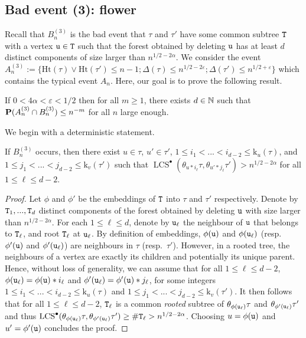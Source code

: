 \documentclass[11pt,reqno]{amsart}
\newcommand{\Ht}{\mathrm{Ht}}
\newcommand{\rk}{\mathrm{k}}
\newcommand{\LCS}{\operatorname{LCS}}
\begin{document}
\subsection{Bad event (3): flower}
Recall that $B_n^{(3)}$ is the bad event that $\tau$ and $\tau'$ have some common subtree $\mathtt{T}$ with a vertex $\mathtt{u} \in \mathtt{T}$ such that the forest obtained by deleting $\mathtt{u}$ has at least $d$ distinct components of size larger than $n^{1/2-2\alpha}$. We consider the event $A_n^{(3)}:=\{\Ht(\tau)\vee\Ht(\tau')\leq n-1 ; \Delta(\tau)\leq n^{1/2-2\varepsilon} ; \Delta(\tau')\leq n^{1/2+\varepsilon}\}$ which contains the typical event $A_n$. Here, our goal is to prove the following result. 

\begin{prop}
\label{prop:no_flowers}
    If $0 < 4\alpha < \varepsilon < 1/2$ then for all $m \geq 1$, there exists $d \in \mathbb{N}$ such that $\mathbf{P}(A_n^{(3)}\cap B_n^{(3)}) \leq n^{-m}$ for all $n$ large enough.
\end{prop}

We begin with a deterministic statement.

\begin{lem}
\label{deter-lemma:no_flowers}
If $B_n^{(3)}$ occurs, then there exist $u \in \tau$, $u' \in \tau'$, $1 \leq i_1 < ... < i_{d-2} \leq \rk_{u}(\tau)$, and $1 \leq j_1 < ... < j_{d-2} \leq \rk_{v}(\tau')$ such that $\LCS^\bullet(\theta_{u*i_\ell}\tau,\theta_{u'*j_\ell}\tau') > n^{1/2-2\alpha}$ for all $1 \leq \ell \leq d-2$.
\end{lem}

\begin{proof}
Let $\phi$ and $\phi'$ be the embeddings of $\mathtt{T}$ into $\tau$ and $\tau'$ respectively. Denote by $\mathtt{T}_1,...,\mathtt{T}_d$ distinct components of the forest obtained by deleting $\mathtt{u}$ with size larger than $n^{1/2-2\alpha}$. For each $1\leq \ell\leq d$, denote by $\mathtt{u}_\ell$ the neighbour of $\mathtt{u}$ that belongs to $\mathtt{T}_\ell$, and root $\mathtt{T}_\ell$ at $\mathtt{u}_\ell$. By definition of embeddings, $\phi(\mathtt{u})$ and $\phi(\mathtt{u}_\ell)$ (resp.~$\phi'(\mathtt{u})$ and $\phi'(\mathtt{u}_\ell)$) are neighbours in $\tau$ (resp.~$\tau'$). However, in a rooted tree, the neighbours of a vertex are exactly its children and potentially its unique parent. Hence, without loss of generality, we can assume that for all $1\leq \ell\leq d-2$, $\phi(\mathtt{u}_\ell)=\phi(\mathtt{u})*i_\ell$ and $\phi'(\mathtt{u}_\ell)=\phi'(\mathtt{u})*j_\ell$, for some integers $1 \leq i_1 < ... < i_{d-2} \leq \rk_{u}(\tau)$ and $1 \leq j_1 < ... < j_{d-2} \leq \rk_{v}(\tau')$. It then follows that for all $1\leq \ell\leq d-2$, $\mathtt{T}_\ell$ is a common \emph{rooted} subtree of $\theta_{\phi(\mathtt{u}_\ell)}\tau$ and $\theta_{\phi'(\mathtt{u}_\ell)}\tau'$ and thus $\LCS^\bullet(\theta_{\phi(\ttu_\ell)}\tau,\theta_{\phi'(\ttu_\ell)}\tau')\geq \#\ttT_\ell>n^{1/2-2\alpha}$. Choosing $u=\phi(\mathtt{u})$ and $u'=\phi'(\mathtt{u})$ concludes the proof.
\end{proof}
\end{document}
